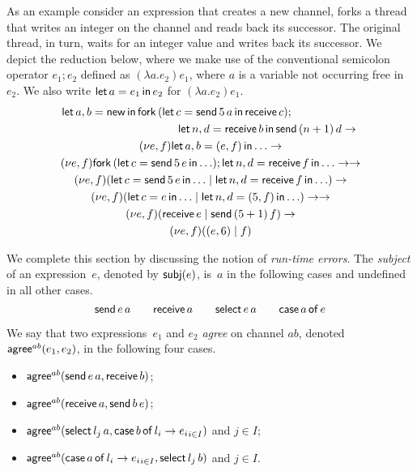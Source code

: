 As an example consider an expression that creates a new channel, forks
a thread that writes an integer on the channel and reads back its
successor. The original thread, in turn, waits for an integer value
and writes back its successor. We depict the reduction below, where we
make use of the conventional semicolon operator $e_1;e_2$ defined as
$(\lambda a.e_2)e_1$, where $a$ is a variable not occurring free
in~$e_2$. We also write $\mathsf{let}\,{a}={e_1}\,\mathsf{in}\,{e_2}$ for $(\lambda a.e_2)e_1$.
%
\begin{gather*}
  \mathsf{let}\, a,b = \mathsf{new}\,\mathsf{in}\,
    \mathsf{fork}\,(\mathsf{let}\,{c}={\mathsf{send}\,{5}\,{a}}\,\mathsf{in}\,{\mathsf{receive}\,{c}});\qquad \qquad \qquad
    \\\qquad \qquad \qquad \qquad \qquad
    \mathsf{let}\,{n,d}={\mathsf{receive}\,{b}}\,\mathsf{in}\,{\mathsf{send}\,{(n+1)}\,{d}}
  \rightarrow
  \\
  (\nu e,f)\mathsf{let}\,{a,b}={(e,f)}\,\mathsf{in}\,{\dots} \rightarrow
  \\
  (\nu e,f) \mathsf{fork}\,(\mathsf{let}\,{c}={\mathsf{send}\,{5}\,{e}}\,\mathsf{in}\,{\dots});
    \mathsf{let}\,{n,d}={\mathsf{receive}\,{f}}\,\mathsf{in}\,{\dots} \rightarrow \rightarrow
  \\
  (\nu e,f) (\mathsf{let}\,{c}={\mathsf{send}\,{5}\,{e}}\,\mathsf{in}\,{\dots} \mid \mathsf{let}\,{n,d}={\mathsf{receive}\,{f}}\,\mathsf{in}\,{\dots})
  \rightarrow
  \\
  (\nu e,f) (\mathsf{let}\,{c}={e}\,\mathsf{in}\,{\dots} \mid \mathsf{let}\,{n,d}={(5,f)}\,\mathsf{in}\,{\dots})
  \rightarrow \rightarrow 
  \\
  (\nu e,f) (\mathsf{receive}\,{e} \mid \mathsf{send}\,{(5+1)}\,{f})
  \rightarrow
  \\
  (\nu e,f)((e,6) \mid f)
\end{gather*}


We complete this section by discussing the notion of \emph{run-time
  errors}. The \emph{subject} of an expression~$e$, denoted by
$\mathsf{subj}(e)$, is~$a$ in the following cases and undefined in all other
cases.
%
\begin{equation*}
  \mathsf{send}\,{e}\,{a} \qquad
  \mathsf{receive}\,{a} \qquad
  \mathsf{select}{\,{e}\,{a}} \qquad
  \mathsf{case}\,{a}\,\mathsf{of}\,{e}
\end{equation*}

We say that two expressions~$e_1$ and $e_2$ \emph{agree} on channel
$ab$, denoted $\mathsf{agree}^{ab}( e_1,e_2)$, in the following four cases.
%
\begin{itemize}
\item $\mathsf{agree}^{ab}(\mathsf{send}\,{e}\,{a}, \mathsf{receive}\,{b})$;
\item $\mathsf{agree}^{ab}(\mathsf{receive}\,{a},\mathsf{send}\,{b}\,{e})$;
\item $\mathsf{agree}^{ab}(\mathsf{select}{\,{l_j}\,{a}}, \mathsf{case}\,{b}\,\mathsf{of}\,{l_i\rightarrow e_i}_{i\in
    I})$ and $j\in I$;
\item $\mathsf{agree}^{ab}(\mathsf{case}\,{a}\,\mathsf{of}\,{l_i\rightarrow e_i}_{i\in
    I}, \mathsf{select}{\,{l_j}\,{b}})$ and $j\in I$.
\end{itemize}

